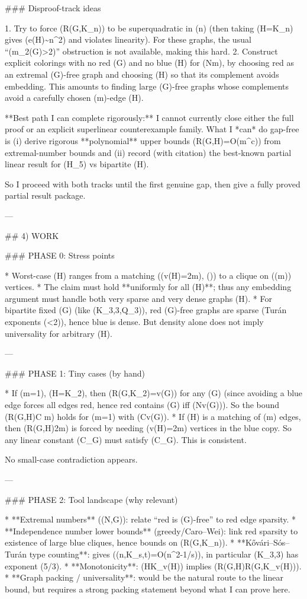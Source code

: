 ### Disproof-track ideas

1. Try to force (R(G,K_n)) to be superquadratic in (n) (then taking (H=K_n) gives (e(H)\sim n^2) and violates linearity). For these graphs, the usual “(m_2(G)>2)” obstruction is not available, making this hard.
2. Construct explicit colorings with no red (G) and no blue (H) for (N\gg m), by choosing red as an extremal (G)-free graph and choosing (H) so that its complement avoids embedding. This amounts to finding large (G)-free graphs whose complements avoid a carefully chosen (m)-edge (H).

**Best path I can complete rigorously:** I cannot currently close either the full proof or an explicit superlinear counterexample family. What I *can* do gap-free is (i) derive rigorous **polynomial** upper bounds (R(G,H)=O(m^c)) from extremal-number bounds and (ii) record (with citation) the best-known partial linear result for (H_5) vs bipartite (H).

So I proceed with both tracks until the first genuine gap, then give a fully proved partial result package.

---

## 4) WORK

### PHASE 0: Stress points

* Worst-case (H) ranges from a matching ((v(H)=2m), ()) to a clique on (\Theta(\sqrt m)) vertices.
* The claim must hold **uniformly for all (H)**; thus any embedding argument must handle both very sparse and very dense graphs (H).
* For bipartite fixed (G) (like (K_{3,3},Q_3)), red (G)-free graphs are sparse (Turán exponents (<2)), hence blue is dense. But density alone does not imply universality for arbitrary (H).

---

### PHASE 1: Tiny cases (by hand)

* If (m=1), (H=K_2), then (R(G,K_2)=v(G)) for any (G) (since avoiding a blue edge forces all edges red, hence red contains (G) iff (N\ge v(G))). So the bound (R(G,H)\le C m) holds for (m=1) with (C\ge v(G)).
* If (H) is a matching of (m) edges, then (R(G,H)\ge 2m) is forced by needing (v(H)=2m) vertices in the blue copy. So any linear constant (C_G) must satisfy (C_G). This is consistent.

No small-case contradiction appears.

---

### PHASE 2: Tool landscape (why relevant)

* **Extremal numbers** ((N,G)): relate “red is (G)-free” to red edge sparsity.
* **Independence number lower bounds** (greedy/Caro–Wei): link red sparsity to existence of large blue cliques, hence bounds on (R(G,K_n)).
* **Kővári–Sós–Turán type counting**: gives ((n,K_{s,t})=O(n^{2-1/s})), in particular (K_{3,3}) has exponent (5/3).
* **Monotonicity**: (H\subseteq K_{v(H)}) implies (R(G,H)\le R(G,K_{v(H)})).
* **Graph packing / universality**: would be the natural route to the linear bound, but requires a strong packing statement beyond what I can prove here.

